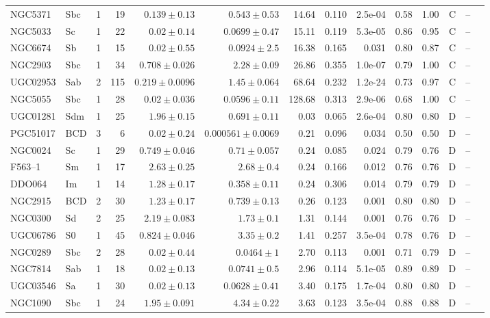\documentclass[9pt]{extarticle}
\begin{document}
{\begin{longtable}{lllrrrrrrrrcrl}
NGC5371 & Sbc & 1 & 19 & $0.139\pm0.13$ & $0.543\pm0.53$ & 14.64 & 0.110 & 2.5e-04 & 0.58 & 1.00 & C & -- & \\
NGC5033 & Sc & 1 & 22 & $0.02\pm0.14$ & $0.0699\pm0.47$ & 15.11 & 0.119 & 5.3e-05 & 0.86 & 0.95 & C & -- & \\
NGC6674 & Sb & 1 & 15 & $0.02\pm0.55$ & $0.0924\pm2.5$ & 16.38 & 0.165 & 0.031 & 0.80 & 0.87 & C & -- & \\
NGC2903 & Sbc & 1 & 34 & $0.708\pm0.026$ & $2.28\pm0.09$ & 26.86 & 0.355 & 1.0e-07 & 0.79 & 1.00 & C & -- & \\
UGC02953 & Sab & 2 & 115 & $0.219\pm0.0096$ & $1.45\pm0.064$ & 68.64 & 0.232 & 1.2e-24 & 0.73 & 0.97 & C & -- & \\
NGC5055 & Sbc & 1 & 28 & $0.02\pm0.036$ & $0.0596\pm0.11$ & 128.68 & 0.313 & 2.9e-06 & 0.68 & 1.00 & C & -- & \\
\midrule
UGC01281 & Sdm & 1 & 25 & $1.96\pm0.15$ & $0.691\pm0.11$ & 0.03 & 0.065 & 2.6e-04 & 0.80 & 0.80 & D & -- & \\
PGC51017 & BCD & 3 & 6 & $0.02\pm0.24$ & $0.000561\pm0.0069$ & 0.21 & 0.096 & 0.034 & 0.50 & 0.50 & D & -- & \\
NGC0024 & Sc & 1 & 29 & $0.749\pm0.046$ & $0.71\pm0.057$ & 0.24 & 0.085 & 0.024 & 0.79 & 0.76 & D & -- & \\
F563--1 & Sm & 1 & 17 & $2.63\pm0.25$ & $2.68\pm0.4$ & 0.24 & 0.166 & 0.012 & 0.76 & 0.76 & D & -- & \\
DDO064 & Im & 1 & 14 & $1.28\pm0.17$ & $0.358\pm0.11$ & 0.24 & 0.306 & 0.014 & 0.79 & 0.79 & D & -- & \\
NGC2915 & BCD & 2 & 30 & $1.23\pm0.17$ & $0.739\pm0.13$ & 0.26 & 0.123 & 0.001 & 0.80 & 0.80 & D & -- & \\
NGC0300 & Sd & 2 & 25 & $2.19\pm0.083$ & $1.73\pm0.1$ & 1.31 & 0.144 & 0.001 & 0.76 & 0.76 & D & -- & \\
UGC06786 & S0 & 1 & 45 & $0.824\pm0.046$ & $3.35\pm0.2$ & 1.41 & 0.257 & 3.5e-04 & 0.78 & 0.76 & D & -- & \\
NGC0289 & Sbc & 2 & 28 & $0.02\pm0.44$ & $0.0464\pm1$ & 2.70 & 0.113 & 0.001 & 0.71 & 0.79 & D & -- & \\
NGC7814 & Sab & 1 & 18 & $0.02\pm0.13$ & $0.0741\pm0.5$ & 2.96 & 0.114 & 5.1e-05 & 0.89 & 0.89 & D & -- & \\
UGC03546 & Sa & 1 & 30 & $0.02\pm0.13$ & $0.0628\pm0.41$ & 3.40 & 0.175 & 1.7e-04 & 0.80 & 0.80 & D & -- & \\
NGC1090 & Sbc & 1 & 24 & $1.95\pm0.091$ & $4.34\pm0.22$ & 3.63 & 0.123 & 3.5e-04 & 0.88 & 0.88 & D & -- & \\

\end{longtable}}
\end{document}
